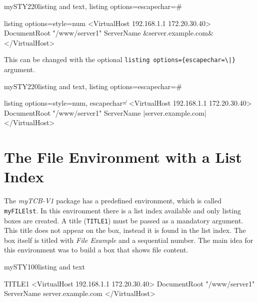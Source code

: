 \documentclass[]{myHOWTO-V001}
\begin{document}
\begin{myTEXEXdoclst}{mySTY220}{listing and text, listing options={escapechar=\#}}
\begin{myFILE}{listing options={style=num}}
<VirtualHost 192.168.1.1 172.20.30.40>
	DocumentRoot "/www/server1"
	ServerName &{\color{red}server.example.com}&
</VirtualHost>
\end{myFILE}
\end{myTEXEXdoclst}

This can be changed with the optional \verb#listing options={escapechar=\|}# argument.

\begin{myTEXEXdoclst}{mySTY220}{listing and text, listing options={escapechar=\#}}
\begin{myFILE}{listing options={style=num, escapechar=\|}}
<VirtualHost 192.168.1.1 172.20.30.40>
	DocumentRoot "/www/server1"
	ServerName |{\color{red}server.example.com}|
</VirtualHost>
\end{myFILE}
\end{myTEXEXdoclst}

%
%

\section{The File Environment with a List Index}

The \emph{myTCB-V1} package has a predefined environment, which is called \Verb|myFILElst|. In this environment there is a list index available and only listing boxes are created. A title (\verb|TITLE1|) must be passed as a mandatory argument. This title does not appear on the box, instead it is found in the list index. The box itself is titled with \emph{File Example} and a sequential number. The main idea for this environment was to build a box that shows file content.

\begin{myTEXEXdoclst}{mySTY100}{listing and text}
\begin{myFILElst}{TITLE1}{}
<VirtualHost 192.168.1.1 172.20.30.40>
	DocumentRoot "/www/server1"
	ServerName server.example.com
</VirtualHost>
\end{myFILElst}
\end{myTEXEXdoclst}
\end{document}
